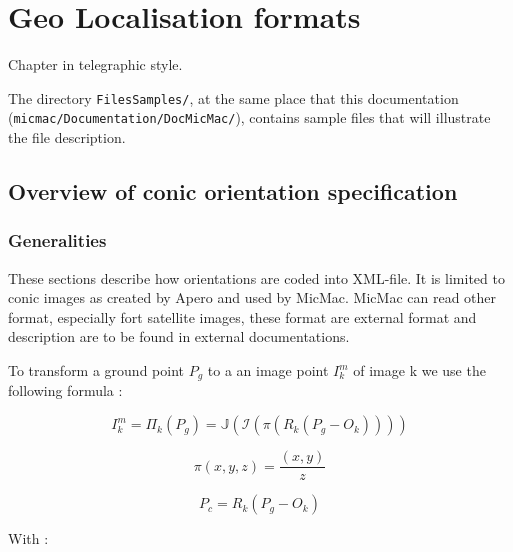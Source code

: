 \chapter{Geo Localisation formats}

\label{Chap:GeoLoc}


Chapter in telegraphic style. 

The directory {\tt FilesSamples/}, at the same place that this documentation
({\tt micmac/Documentation/DocMicMac/}), contains sample files that will illustrate
the file description.


\section{Overview of conic orientation specification}


\subsection{Generalities}

These sections describe how orientations are coded into XML-file. It is limited
to conic images as created by Apero and used by MicMac.   MicMac can read
other format, especially fort satellite images, these format are external format
and description are to be found in external documentations.


To transform a ground point $P_g$   to a an image point $I^m_k$ of image k we use the following formula :

\begin{equation}
    I^m_k =  \Pi_k(P_g) =  \mathbb{J}(   \mathcal{I} (\pi (R_k (P_g -O_k))))
\end{equation}

\begin{equation}
    \pi(x,y,z) =  \frac{(x,y)}{z} \label{Proj:Stenope}
\end{equation}

\begin{equation}
    P_c = R_k (P_g -O_k)
\end{equation}

With :

